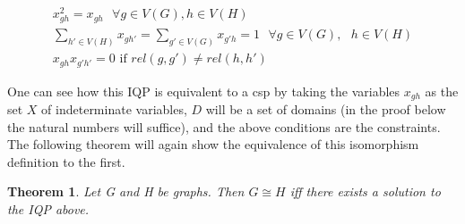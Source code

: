 \documentclass[12pt]{article}
\newtheorem{thm}{Theorem}[section]
\begin{document}
\begin{subequations}
\label{IQP}
\begin{align}
x_{gh}^2 = x_{gh} \text{ } \forall g \in V(G), h \in V(H) \\ \sum_{h'
  \in V(H)} x_{gh'} = \sum_{g' \in V(G)} x_{g'h} = 1 \text{ } \forall
g \in V(G), \text{ } h \in V(H) \\ x_{gh}x_{g'h'} = 0 \text{ if }
rel(g, g') \neq rel(h, h')
\end{align}
\end{subequations}

One can see how this IQP is equivalent to a csp by taking the
variables $x_{gh}$ as the set $X$ of indeterminate variables, $D$ will
be a set of domains (in the proof below the natural numbers will
suffice), and the above conditions are the constraints. The following
theorem will again show the equivalence of this isomorphism definition
to the first.

\begin{thm}
  Let G and H be graphs. Then $G \cong H$ iff there exists a solution
  to the IQP above.
\end{thm}
\end{document}
